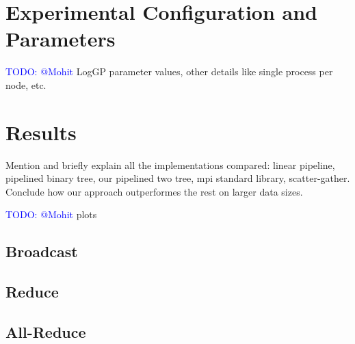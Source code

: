 \documentclass[sigplan,review,anonymous]{acmart}\settopmatter{printfolios=true,printccs=false,printacmref=false}
\begin{document}
\section{Experimental Configuration and Parameters}\label{sec:Config}

\textcolor{blue}{TODO: @Mohit} LogGP parameter values, other details like single process per node, etc.

\section{Results}\label{sec:Results}
Mention and briefly explain all the implementations compared: linear pipeline, pipelined binary tree, our pipelined two tree, mpi standard library, scatter-gather. Conclude how our approach outperformes the rest on larger data sizes.

\textcolor{blue}{TODO: @Mohit} plots

\subsection{Broadcast}
\subsection{Reduce}
\subsection{All-Reduce}



\end{document}
